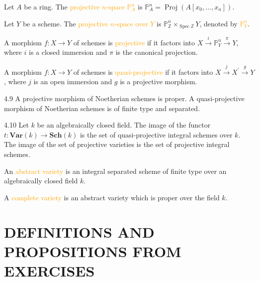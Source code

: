 \begin{definition}
	Let $A$ be a ring. The \textcolor{orange}{projective $n$-space $\mathbb{P}_A^n$} is $\mathbb{P}_A^n=\operatorname{Proj}\!\left(A\!\left[x_0,\dots,x_n\right]\right)$.
	
	Let $Y$ be a scheme. The \textcolor{orange}{projective $n$-space over $Y$} is $\mathbb{P}_\mathbb{Z}^n\times_{\operatorname{Spec}\mathbb{Z}}Y$, denoted by \textcolor{orange}{$\mathbb{P}_Y^n$}.
	
	A morphism $f:X\rightarrow Y$ of schemes is \textcolor{orange}{projective} if it factors into $X\xrightarrow{i}\mathbb{P}_Y^n\xrightarrow{\pi}Y$, where $i$ is a closed immersion and $\pi$ is the canonical projection.
	
	A morphism $f:X\rightarrow Y$ of schemes is \textcolor{orange}{quasi-projective} if it factors into $X\xrightarrow{j}X^\prime\xrightarrow{g}Y$, where $j$ is an open immersion and $g$ is a projective morphism.
\end{definition}

\begin{theorem}{4.9}
	A projective morphism of Noetherian schemes is proper. A quasi-projective morphism of Noetherian schemes is of finite type and separated.
\end{theorem}

\begin{proposition}{4.10}
	Let $k$ be an algebraically closed field. The image of the functor $t:\mathbf{Var}(k)\rightarrow\mathbf{Sch}(k)$ is the set of quasi-projective integral schemes over $k$. The image of the set of projective varieties is the set of projective integral schemes.
\end{proposition}

\begin{definition}
	An \textcolor{orange}{abstract variety} is an integral separated scheme of finite type over an algebraically closed field $k$.
	
	A \textcolor{orange}{complete variety} is an abstract variety which is proper over the field $k$.
\end{definition}

\section*{DEFINITIONS AND PROPOSITIONS FROM EXERCISES}
